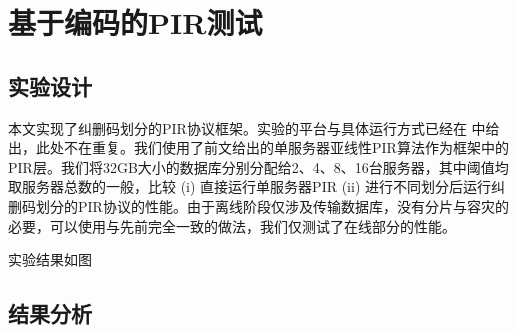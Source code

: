 \section{基于编码的PIR测试}
\subsection{实验设计}
本文实现了纠删码划分的PIR协议框架。实验的平台与具体运行方式已经在 \label{sec:evaluation} 中给出，此处不在重复。我们使用了前文给出的单服务器亚线性PIR算法作为框架中的PIR层。我们将32GB大小的数据库分别分配给2、4、8、16台服务器，其中阈值均取服务器总数的一般，比较 (i) 直接运行单服务器PIR (ii) 进行不同划分后运行纠删码划分的PIR协议的性能。由于离线阶段仅涉及传输数据库，没有分片与容灾的必要，可以使用与先前完全一致的做法，我们仅测试了在线部分的性能。

实验结果如图
\subsection{结果分析}